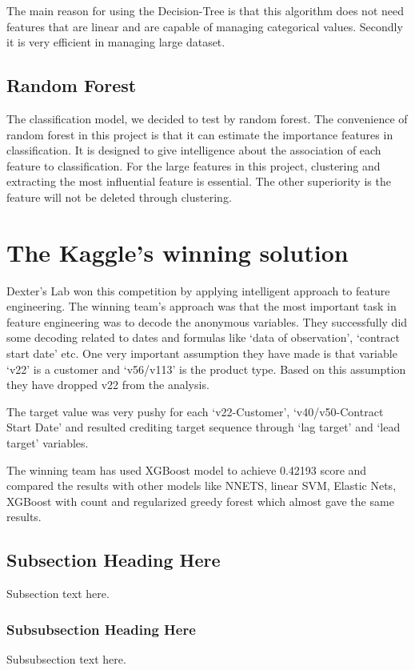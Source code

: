 \documentclass[conference, onecolumn]{IEEEtran}
\begin{document}
The main reason for using the Decision-Tree is that this algorithm does not need features that are linear and are capable of managing categorical values. Secondly it is very efficient in managing large dataset. 

\subsection{Random Forest}


The classification model, we decided to test by random forest. The convenience of random forest in this project is that it can estimate the importance features in classification. It is designed to give intelligence about the association of each feature to classification. For the large features in this project, clustering and extracting the most influential feature is essential. The other superiority is the feature will not be deleted through clustering. 



\section{The Kaggle's winning solution}
Dexter’s Lab won this competition by applying intelligent approach to feature engineering.  The winning team's approach was that the most important task in feature engineering was to decode the anonymous variables. They successfully did some decoding related to dates and formulas like ‘data of observation’, ‘contract start date’ etc. One very important assumption they have made is that variable ‘v22’ is a customer and ‘v56/v113’ is the product type. Based on this assumption they have dropped v22 from the analysis.

The target value was very pushy for each ‘v22-Customer’, ‘v40/v50-Contract Start Date’ and resulted crediting target sequence through ‘lag target’ and ‘lead target’ variables. 

The winning team has used XGBoost model to achieve 0.42193 score and compared the results with other models like NNETS, linear SVM, Elastic Nets, XGBoost with count and regularized greedy forest which almost gave the same results.


\subsection{Subsection Heading Here}
Subsection text here.


\subsubsection{Subsubsection Heading Here}
Subsubsection text here.
\end{document}
